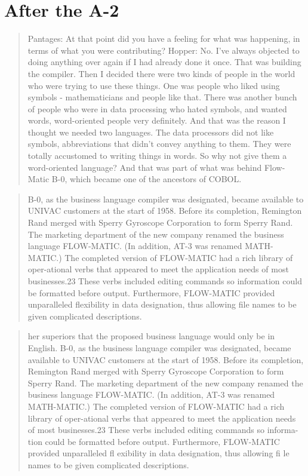 \section{After the A-2}

\begin{quotation}
    Pantages: At that point did you have a feeling for what was happening, in terms of what you
    were contributing?
    Hopper: No. I've always objected to doing anything over again if I had already done it
    once. That was building the compiler. Then I decided there were two kinds of people in the
    world who were trying to use these things. One was people who liked using symbols -
    mathematicians and people like that. There was another bunch of people who were in data
    processing who hated symbols, and wanted words, word-oriented people very definitely. And
    that was the reason I thought we needed two languages.
    The data processors did not like symbols, abbreviations that didn't convey anything to them.
    They were totally accustomed to writing things in words. So why not give them a word-oriented
    language? And that was part of what was behind Flow-Matic B-0, which became one of the
    ancestors of COBOL.
\end{quotation}


\begin{quotation}
    B-0, as the business language compiler was designated, became available to
    UNIVAC customers at the start of 1958. Before its completion, Remington Rand
    merged with Sperry Gyroscope Corporation to form Sperry Rand. The marketing
    department of the new company renamed the business language FLOW-MATIC. (In
    addition, AT-3 was renamed MATH-MATIC.) The completed version of FLOW-MATIC had
    a rich library of oper-ational verbs that appeared to meet the application
    needs of most businesses.23 These verbs included editing commands so
    information could be formatted before output. Furthermore, FLOW-MATIC provided
    unparalleled flexibility in data designation, thus allowing file names to be
    given complicated descriptions.
\end{quotation}

\begin{quotation}
    her superiors that the proposed business language would only be in English.
    B-0, as the business language compiler was designated, became available to
    UNIVAC customers at the start of 1958. Before its completion, Remington Rand
    merged with Sperry Gyroscope Corporation to form Sperry Rand. The marketing
    department of the new company renamed the business language FLOW-MATIC. (In
    addition, AT-3 was renamed MATH-MATIC.) The completed version of FLOW-MATIC had
    a rich library of oper-ational verbs that appeared to meet the application
    needs of most businesses.23 These verbs included editing commands so
    informa-tion could be formatted before output. Furthermore, FLOW-MATIC provided
    unparalleled fl exibility in data designation, thus allowing fi le names to be
    given complicated descriptions.
\end{quotation}

